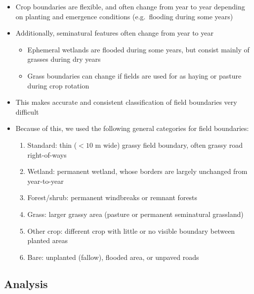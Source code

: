 \documentclass[]{elsarticle} %
\providecommand{\tightlist}{%
  \setlength{\itemsep}{0pt}\setlength{\parskip}{0pt}}
\begin{document}
\begin{itemize}
  \begin{itemize}
  \tightlist
  \item
    Crop boundaries are flexible, and often change from year to year depending on planting and emergence conditions (e.g.~flooding during some years)
  \item
    Additionally, seminatural features often change from year to year

    \begin{itemize}
    \tightlist
    \item
      Ephemeral wetlands are flooded during some years, but consist mainly of grasses during dry years
    \item
      Grass boundaries can change if fields are used for as haying or pasture during crop rotation
    \end{itemize}
  \item
    This makes accurate and consistent classification of field boundaries very difficult
  \item
    Because of this, we used the following general categories for field boundaries:

    \begin{enumerate}
    \def\labelenumi{\arabic{enumi}.}
    \tightlist
    \item
      Standard: thin (\(<10\) m wide) grassy field boundary, often grassy road right-of-ways
    \item
      Wetland: permanent wetland, whose borders are largely unchanged from year-to-year
    \item
      Forest/shrub: permanent windbreaks or remnant forests
    \item
      Grass: larger grassy area (pasture or permanent seminatural grassland)
    \item
      Other crop: different crop with little or no visible boundary between planted areas
    \item
      Bare: unplanted (fallow), flooded area, or unpaved roads
    \end{enumerate}
  \end{itemize}
\end{itemize}

\hypertarget{analysis}{%
\subsection{Analysis}\label{analysis}}
\end{document}
